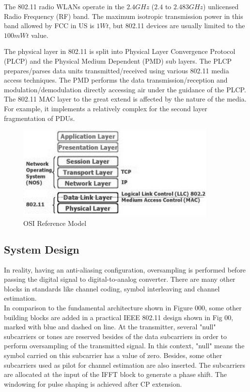 The 802.11 radio WLANs operate in the $2.4 GHz$ ($2.4$ to $2.483 GHz$) unlicensed Radio Frequency (RF) band. The maximum isotropic transmission power in this band allowed by FCC in US is $1 Wt$, but 802.11 devices are usually limited to the $100 mWt$ value.

The physical layer in 802.11 is split into Physical Layer Convergence Protocol (PLCP) and the Physical Medium Dependent (PMD) sub layers. The PLCP prepares/parses data units transmitted/received using various 802.11 media access techniques. The PMD performs the data transmission/reception and modulation/demodulation directly accessing air under the guidance of the PLCP. The 802.11 MAC layer to the great extend is affected by the nature of the media. For example, it implements a relatively complex for the second layer fragmentation of PDUs.\\


\begin{figure}[h!]
\centering
\includegraphics[width=10cm]{content/fig/osi.JPG}
\caption{OSI Reference Model}
\label{fig:osi_model}
\end{figure}

\subsection{System Design}

In reality, having an anti-aliasing configuration, oversampling is performed before passing the digital signal to digital-to-analog converter. There are many other blocks in standards like channel coding, symbol interleaving and channel estimation.\\
In comparison to the fundamental architecture shown in Figure 000, some other building blocks are added in a practical IEEE 802.11 design shown in Fig 00, marked with blue and dashed on line. At the transmitter, several "null" subcarriers or tones are reserved besides of the data subcarriers in order to perform oversampling of the transmitted signal. In this context, "null" means the symbol carried on this subcarrier has a value of zero. Besides, some other subcarriers used as pilot for channel estimation are also inserted. The subcarriers are allocated at the input of the IFFT block to generate a phase shift. The windowing for pulse shaping is achieved after CP extension.\\

